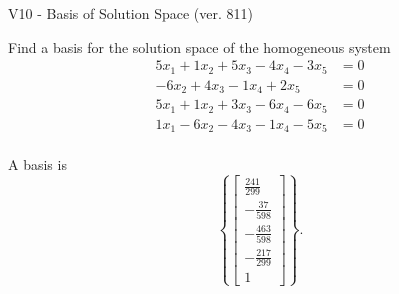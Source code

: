 \begin{exercise}
  \begin{exerciseTitle}V10 - Basis of Solution Space (ver. 811)\end{exerciseTitle}
  \begin{exerciseStatement}
    Find a basis for the solution space of the homogeneous system 
\begin{align*}
 5 x_ 1 + 1 x_ 2 + 5 x_ 3 -4 x_ 4 -3 x_ 5 &= 0  \\ 
  -6 x_ 2 + 4 x_ 3 -1 x_ 4 + 2 x_ 5 &= 0  \\ 
  5 x_ 1 + 1 x_ 2 + 3 x_ 3 -6 x_ 4 -6 x_ 5 &= 0  \\ 
  1 x_ 1 -6 x_ 2 -4 x_ 3 -1 x_ 4 -5 x_ 5 &= 0  \\ 
 \end{align*}


 
  \end{exerciseStatement}

  \begin{exerciseAnswer}
   A basis is   
\[\left\{\left[\begin{array}{c}
\frac{241}{299} \\
-\frac{37}{598} \\
-\frac{463}{598} \\
-\frac{217}{299} \\
1
\end{array}\right]\right\}.\]

  


  \end{exerciseAnswer}
\end{exercise}